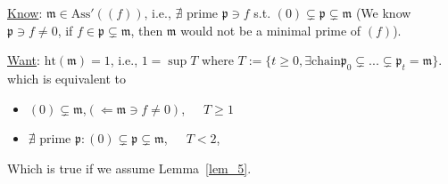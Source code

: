 \documentclass[11pt]{article}
\newcommand{\scm}{{\mathfrak m}}
\newcommand{\scp}{{\mathfrak p}}
\newcommand{\Llta}{\Longleftarrow}
\begin{document}
\underline{Know}: $\scm\in \text{Ass}'((f))$, i.e., $\nexists \text{ prime }\scp\ni f$ s.t. $(0)\subsetneq \scp\subsetneq \scm$ (We know $\scp\ni f\neq 0$, if $f\in\scp\subsetneq\scm$, then $\scm$ would not be a minimal prime of $(f)$).

\underline{Want}: $\text{ht}(\scm)=1$, i.e.,
$1=\sup T$ where $T:=\{t\geq 0,\exists \text{chain} \scp_0\subsetneq ...\subsetneq \scp_t=\scm\}$. which is equivalent to 
\begin{itemize}
\item $(0)\subsetneq \scm$,$(\Llta \scm\ni f\neq 0)$,\ \ \  $T\geq 1$
\item $\nexists$ prime $\scp:(0)\subsetneq \scp\subsetneq\scm$,\ \ \ $T< 2$,
\end{itemize}
Which is true if we assume Lemma~\ref{lem_5}.  
\end{document}
